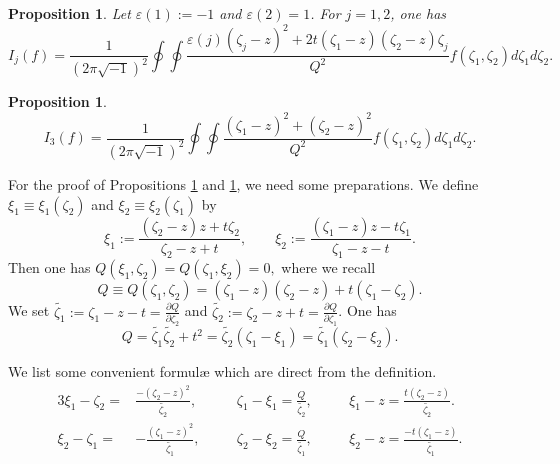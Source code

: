 \documentclass[12pt,leqno]{amsart}
\theoremstyle{plain}
\newtheorem{proposition}[thm]{Proposition}
\theoremstyle{definition}
\begin{document}
\begin{proposition}
\label{prop:23032266}
Let $\varepsilon (1):=-1$
 and $\varepsilon(2)=1$.  
For $j=1,2$, 
one has 
\begin{equation}
  I_j(f)
 = \frac{1}{(2 \pi \sqrt{-1})^2}
   \oint \oint \frac{\varepsilon(j)(\zeta_j-z)^2 + 2 t (\zeta_1-z)(\zeta_2-z)\zeta_j}{Q^2}  
                f (\zeta_1, \zeta_2)d \zeta_1 d \zeta_2.  
\label{eqn:23032266}
\end{equation}
\end{proposition}

\begin{proposition}
\label{prop:23031775}
\begin{equation*}
I_3(f)= \frac {1}{(2\pi \sqrt{-1})^2}
       \oint \oint \frac{(\zeta_1-z)^2 +(\zeta_2-z)^2}{Q^2} f(\zeta_1, \zeta_2) d \zeta_1 d \zeta_2.  
\end{equation*}
\end{proposition}


For the proof of Propositions \ref{prop:23032266} and \ref{prop:23031775}, 
 we need some preparations.  
We define $\xi_1 \equiv \xi_1(\zeta_2)$ and $\xi_2 \equiv \xi_2(\zeta_1)$
 by 
\begin{equation}
\label{eqn:Xi}
 \xi_1:=\frac{(\zeta_2-z)z+t \zeta_2}
             {\zeta_2-z+t}, 
\qquad
 \xi_2 :=\frac{(\zeta_1-z)z-t \zeta_1}
             {\zeta_1-z-t}.  
\end{equation}
Then one has 
$
   Q(\xi_1, \zeta_2)=Q(\zeta_1, \xi_2)=0, 
$
 where we recall 
\[
  Q \equiv Q(\zeta_1, \zeta_2)
  =(\zeta_1-z)(\zeta_2-z)+t(\zeta_1-\zeta_2).  
\]
We set
$\widetilde{\zeta_1}:=\zeta_1-z-t=\frac{\partial Q}{\partial \zeta_2}$
 and $\widetilde{\zeta_2}:=\zeta_2-z+t=\frac{\partial Q}{\partial \zeta_1}$.  
One has
\[
  Q =\widetilde{\zeta_1} \widetilde{\zeta_2}+t^2
    =\widetilde{\zeta_2}(\zeta_1-\xi_1)=\widetilde{\zeta_1}(\zeta_2-\xi_2).  
\]


We list some convenient formul{\ae}
 which are direct from the definition.  
\begin{alignat}{3}
\label{eqn:230317100}
\xi_1-\zeta_2=&\frac{-(\zeta_2-z)^2}{\widetilde{\zeta_2}}, 
\quad
&&\zeta_1-\xi_1=\frac{Q}{\widetilde{\zeta_2}}, 
\quad
&&\xi_1-z=\frac{t(\zeta_2-z)}{\widetilde{\zeta_2}}.  
\\
\label{eqn:23031810}
\xi_2-\zeta_1=&-\frac{(\zeta_1-z)^2}{\widetilde{\zeta_1}}, 
\quad
&&\zeta_2-\xi_2=\frac{Q}{\widetilde {\zeta_1}}, 
\quad
&&\xi_2-z=\frac{-t(\zeta_1-z)}{\widetilde{\zeta_1}}.  
\end{alignat}
\end{document}
